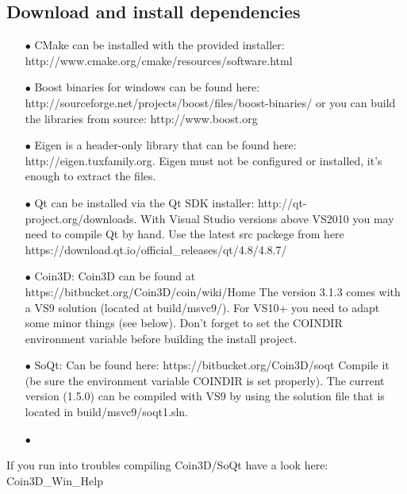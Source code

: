 \subsection{Download and install dependencies}
\begin{itemize}

\item[$\bullet$]CMake can be installed with the provided installer: http://www.cmake.org/cmake/resources/software.html
\item[$\bullet$]Boost binaries for windows can be found here: http://sourceforge.net/projects/boost/files/boost-binaries/ or you can build the libraries from source: http://www.boost.org 
\item[$\bullet$]Eigen is a header-only library that can be found here: http://eigen.tuxfamily.org. Eigen must not be configured or installed, it's enough to extract the files. 
\item[$\bullet$]Qt can be installed via the Qt SDK installer: http://qt-project.org/downloads. With Visual Studio versions above VS2010 you may need to compile Qt by hand. Use the latest src packege from here https://download.qt.io/official\_releases/qt/4.8/4.8.7/
\item[$\bullet$]Coin3D: Coin3D can be found at https://bitbucket.org/Coin3D/coin/wiki/Home The version 3.1.3 comes with a VS9 solution (located at build/msvc9/). For VS10+ you need to adapt some minor things (see below). Don't forget to set the COINDIR environment variable before building the install project.
\item[$\bullet$]SoQt: Can be found here: https://bitbucket.org/Coin3D/soqt Compile it (be sure the environment variable COINDIR is set properly). The current version (1.5.0) can be compiled with VS9 by using the solution file that is located in build/msvc9/soqt1.sln. 
\item[$\bullet$]
\end{itemize}If you run into troubles compiling Coin3D/SoQt have a look here: Coin3D\_Win\_Help
